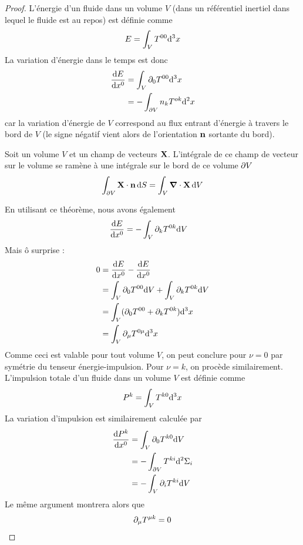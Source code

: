 \begin{proof}
L'énergie d'un fluide dans un volume $V$ (dans un référentiel inertiel dans lequel le fluide est au repos) est définie comme
    \begin{equation}
        E = \int_{V} T^{00} \mathrm{d}^3 x
    \end{equation}
La variation d'énergie dans le temps est donc
\begin{align}
    \frac{\mathrm{d} E}{\mathrm{d} x^{0}} &= \int_{V}\partial_{0}T^{00} \mathrm{d}^3 x \\
    &= - \int_{\partial V} n_k T^{ok}\mathrm{d} ^{2}x
\end{align}
car la variation d'énergie de $V$ correspond au flux entrant d'énergie à travers le bord de $V$ (le signe négatif vient alors de l'orientation $\bm{\mathrm{n}}$ sortante du bord).
\begin{theoremframe}
    \begin{lemme}
        Soit un volume $V$ et un champ de vecteurs $\bm{\mathrm{X}}$. L'intégrale de ce champ de vecteur sur le volume se ramène à une intégrale sur le bord de ce volume $\partial V$
        \begin{equation}
            \int_{\partial V} \bm{\mathrm{X}} \cdot \bm{\mathrm{n}} \, \mathrm{d} S = \int_{V} \bm{\mathrm{\nabla}}\cdot\bm{\mathrm{X}} \,\mathrm{d} V
        \end{equation}
    \end{lemme}
\end{theoremframe}
En utilisant ce théorème, nous avons également
\begin{align}
    \frac{\mathrm{d} E}{\mathrm{d} x^{0}} &=-\int_{V}\partial_{k}T^{0k} \mathrm{d} V
\end{align}
Mais ô surprise :
\begin{align}
    0 &= \frac{\mathrm{d} E}{\mathrm{d} x^{0}} -\frac{\mathrm{d} E}{\mathrm{d} x^{0}} \\
      &= \int_{V}\partial_{0}T^{00} \mathrm{d} V + \int_{V}\partial_{k}T^{0k} \mathrm{d} V\\
      &= \int_{V}(\partial_{0}T^{00} +\partial_{k}T^{0k} )\mathrm{d} ^{3}x\\
      &= \int_{V} \partial_{\mu}T^{0\mu} \mathrm{d}^3 x
\end{align}
Comme ceci est valable pour tout volume $V$, on peut conclure pour $\nu = 0$ par symétrie du tenseur énergie-impulsion. Pour $\nu = k$, on procède similairement. L'impulsion totale d'un fluide dans un volume $V$ est définie comme
    \begin{equation}
        P^{k} = \int_{V} T^{k0}\mathrm{d} ^3x
    \end{equation}
La variation d'impulsion est similairement calculée par
\begin{align}
    \frac{\mathrm{d} P^k}{\mathrm{d} x^{0}} &=\int_{V}\partial_{0}T^{k0} \mathrm{d} V\\
    &=- \int_{\partial V}T^{ki} \mathrm{d} ^2\Sigma_{i}\\
    &= - \int_{V}\partial_{i}T^{ki} \mathrm{d} V\\
\end{align}
Le même argument montrera alors que
\begin{equation}
    \partial_\mu T^{\mu k} = 0
\end{equation}
\end{proof}
